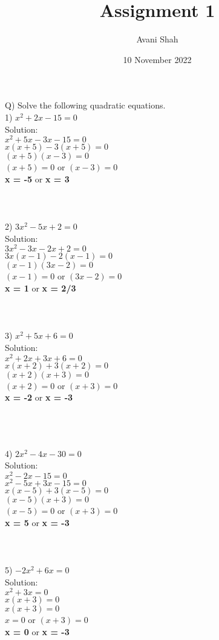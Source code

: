 \documentclass[12pt]{article}
\begin{document}
\title{Assignment 1}
\author{Avani Shah}
\date{10 November 2022}

\maketitle

\newpage
Q) Solve the following quadratic equations. \\

1) $x^2+2x-15=0$ \\
Solution: \\
$x^2+5x-3x-15=0$ \\
$x(x+5)-3(x+5)=0$ \\
$(x+5)(x-3)=0$ \\
$(x+5)=0$ or $(x-3)=0$ \\
\textbf{x = -5} or \textbf{x = 3} \\
\\\\\\

2) $3x^2-5x+2=0$ \\
Solution: \\
$3x^2-3x-2x+2=0$ \\
$3x(x-1)-2(x-1)=0$ \\
$(x-1)(3x-2)=0$ \\
$(x-1)=0$ or $(3x-2)=0$ \\
\textbf{x = 1} or \textbf{x = 2/3} \\
\\\\\\

3) $x^2+5x+6=0$ \\
Solution: \\
$x^2+2x+3x+6=0$ \\
$x(x+2)+3(x+2)=0$ \\
$(x+2)(x+3)=0$ \\
$(x+2)=0$ or $(x+3)=0$ \\
\textbf{x = -2} or \textbf{x = -3} \\
\\\\\\

\newpage

4) $2x^2-4x-30=0$ \\
Solution: \\
$x^2-2x-15=0$ \\
$x^2-5x+3x-15=0$ \\
$x(x-5)+3(x-5)=0$ \\
$(x-5)(x+3)=0$ \\
$(x-5)=0$ or $(x+3)=0$ \\
\textbf{x = 5} or \textbf{x = -3} \\
\\\\\\

5) $-2x^2+6x=0$ \\
Solution: \\
$x^2+3x=0$ \\
$x(x+3)=0$ \\
$x(x+3)=0$ \\
$x=0$ or $(x+3)=0$ \\
\textbf{x = 0} or \textbf{x = -3} \\
\\\\\\
\end{document}
